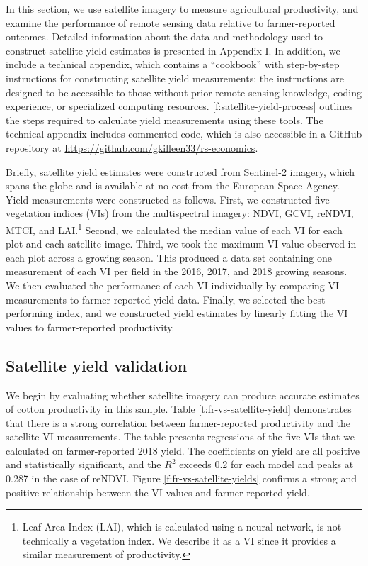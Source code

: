 \documentclass{article}
\begin{document}
In this section, we use satellite imagery to measure agricultural productivity, and examine the performance of remote sensing data relative to farmer-reported outcomes. Detailed information about the data and methodology used to construct satellite yield estimates is presented in Appendix I. In addition, we include a technical appendix, which contains a ``cookbook'' with step-by-step instructions for constructing satellite yield measurements; the instructions are designed to be accessible to those without prior remote sensing knowledge, coding experience, or specialized computing resources. \ref{f:satellite-yield-process} outlines the steps required to calculate yield measurements using these tools. The technical appendix includes commented code, which is also accessible in a GitHub repository at \url{https://github.com/gkilleen33/rs-economics}. 

Briefly, satellite yield estimates were constructed from Sentinel-2 imagery, which spans the globe and is available at no cost from the European Space Agency. Yield measurements were constructed as follows. First, we constructed five vegetation indices (VIs) from the multispectral imagery: NDVI, GCVI, reNDVI, MTCI, and LAI.\footnote{Leaf Area Index (LAI), which is calculated using a neural network, is not technically a vegetation index. We describe it as a VI since it provides a similar measurement of productivity.} Second, we calculated the median value of each VI for each plot and each satellite image. Third, we took the maximum VI value observed in each plot across a growing season. This produced a data set containing one measurement of each VI per field in the 2016, 2017, and 2018 growing seasons. We then evaluated the performance of each VI individually by comparing VI measurements to farmer-reported yield data. Finally, we selected the best performing index, and we constructed yield estimates by linearly fitting the VI values to farmer-reported productivity. 

\subsection{Satellite yield validation} \label{section:satellite-validation}

We begin by evaluating whether satellite imagery can produce accurate estimates of cotton productivity in this sample. Table \ref{t:fr-vs-satellite-yield} demonstrates that there is a strong correlation between farmer-reported productivity and the satellite VI measurements. The table presents regressions of the five VIs that we calculated on farmer-reported 2018 yield. The coefficients on yield are all positive and statistically significant, and the $R^2$ exceeds 0.2 for each model and peaks at 0.287 in the case of reNDVI. Figure \ref{f:fr-vs-satellite-yields} confirms a strong and positive relationship between the VI values and farmer-reported yield. 
\end{document}
